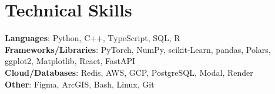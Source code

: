\documentclass[letterpaper,10pt]{article}
\begin{document}
\section{Technical Skills}
 \begin{itemize}[leftmargin=0.15in, label={}]
    \small{\item{
     \textbf{Languages}{: Python, C++, TypeScript, SQL, R} \\
     \textbf{Frameworks/Libraries}{: PyTorch, NumPy, scikit-Learn, pandas, Polars, ggplot2, Matplotlib, React, FastAPI} \\
     \textbf{Cloud/Databases}{: Redis, AWS, GCP, PostgreSQL, Modal, Render} \\
     \textbf{Other}{: Figma, ArcGIS, Bash, Linux, Git}
    }}
 \end{itemize}


\end{document}
